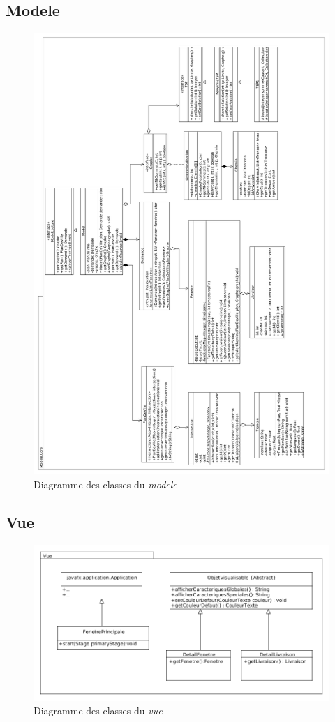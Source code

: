\documentclass[10pt,a4paper]{book}
\begin{document}
\subsection{Modele}
\begin{figure}[h!]
    \centering
    \includegraphics[scale=0.28]{modele.png}
    \caption{Diagramme des classes du \textit{modele}}
\end{figure}
\newpage
\subsection{Vue}
\begin{figure}[h!]
    \centering
    \includegraphics[scale=0.4]{vue.png}
    \caption{Diagramme des classes du \textit{vue}}
\end{figure}
\end{document}
